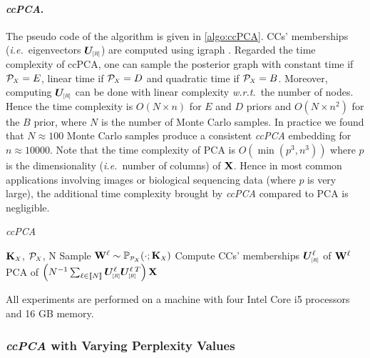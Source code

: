 \paragraph{\textit{ccPCA}.} The pseudo code of the algorithm is given in \cref{algo:ccPCA}. CCs' memberships (\textit{i.e.}\ eigenvectors $\bm{U}_{\scaleto{[R]}{5pt}}$) are computed using igraph \citep{csardi2006igraph}. Regarded the time complexity of ccPCA, one can sample the posterior graph with constant time if $\mathcal{P}_{\scaleto{X}{4pt}} = E$, linear time if $\mathcal{P}_{\scaleto{X}{4pt}} = D$ and quadratic time if $\mathcal{P}_{\scaleto{X}{4pt}} = B$. Moreover, computing $\bm{U}_{\scaleto{[R]}{5pt}}$ can be done with linear complexity \textit{w.r.t.}\ the number of nodes. Hence the time complexity is $O(N \times n)$ for $E$ and $D$ priors and $O(N \times n^2)$ for the $B$ prior, where $N$ is the number of Monte Carlo samples. In practice we found that $N\approx 100$ Monte Carlo samples produce a consistent \textit{ccPCA} embedding for $n \approx 10000$. Note that the time complexity of PCA is $O(\min(p^3,n^3))$ where $p$ is the dimensionality (\textit{i.e.}\ number of columns) of $\mathbf{X}$. Hence in most common applications involving images or biological sequencing data (where $p$ is very large), the additional time complexity brought by \textit{ccPCA} compared to PCA is negligible.

\vspace{0.5cm}

\begin{algorithm}[H]
  \caption{\textit{ccPCA}}
  \label{alg:3CPCA}
\begin{algorithmic}
   $\mK_{\scaleto{X}{4pt}}$, $\mathcal{P}_{\scaleto{X}{4pt}}$, N
  \STATE Sample $\W^{\ell} \sim  \mathbb{P}_{\scaleto{\mathcal{P}_{\scaleto{X}{4pt}}}{5pt}}(\cdot ; \mK_{\scaleto{X}{4pt}})$
  \STATE Compute CCs' memberships $\bm{U}^{\ell}_{\scaleto{[R]}{5pt}}$ of $\mathbf{W}^{\ell}$
  \ENDFOR
   PCA of $\left(N^{-1}\sum_{\ell \in \integ{N}} \bm{U}^{\ell}_{\scaleto{[R]}{5pt}} \bm{U}_{\scaleto{[R]}{5pt}}^{\ell\:T} \right) \X$
\end{algorithmic}
\label{algo:ccPCA}
\end{algorithm}

All experiments are performed on a
machine with four Intel Core i5 processors and 16 GB memory.

\subsubsection{\textit{ccPCA} with Varying Perplexity Values}\label{sec:other_perp}

